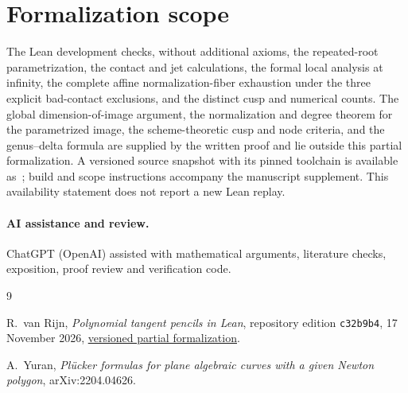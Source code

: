 \documentclass[11pt]{article}
\begin{document}
\section*{Formalization scope}

The Lean development checks, without additional axioms, the
repeated-root parametrization, the contact and jet calculations, the formal
local analysis at infinity, the complete affine normalization-fiber
exhaustion under the three explicit bad-contact exclusions, and the distinct
cusp and numerical counts.
The global dimension-of-image argument, the normalization and degree
theorem for the parametrized image, the scheme-theoretic cusp and node
criteria, and the genus--delta formula are supplied by the written proof
and lie outside this partial formalization.  A versioned source snapshot
with its pinned toolchain is available as~\cite{FormalSources}; build and
scope instructions accompany the manuscript supplement.  This availability
statement does not report a new Lean replay.

\paragraph{AI assistance and review.}
ChatGPT (OpenAI) assisted with mathematical arguments, literature checks,
exposition, proof review and verification code.

\begin{thebibliography}{9}

R.~van Rijn, \emph{Polynomial tangent pencils in Lean},
repository edition \texttt{c32b9b4}, 17 November 2026,
\href{https://github.com/royvanrijn/jacobian-research/tree/c32b9b4d273cf7988e85184a0d5eae9c488727fd/research/foundations/formal/discriminant-pencils}{versioned partial formalization}.

A.~Yuran,
\emph{Pl\"ucker formulas for plane algebraic curves with a given Newton
polygon},
arXiv:2204.04626.

\end{thebibliography}
\end{document}
